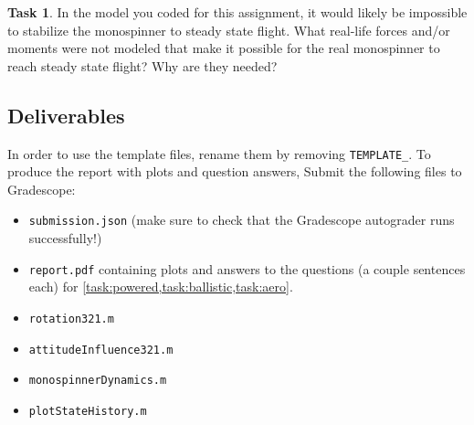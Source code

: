 \documentclass{article}
\theoremstyle{definition}
\newtheorem{task}{Task}
\begin{document}
\begin{task}\label{task:aero}
    In the model you coded for this assignment, it would likely be impossible to stabilize the monospinner to steady state flight. What real-life forces and/or moments were not modeled that make it possible for the real monospinner to reach steady state flight? Why are they needed?
\end{task}

\subsection*{Deliverables}
In order to use the template files, rename them by removing \texttt{TEMPLATE\_}. To produce the report with plots and question answers, Submit the following files to Gradescope:
\begin{itemize}[noitemsep]
    \item \texttt{submission.json} (make sure to check that the Gradescope autograder runs successfully!)
    \item \texttt{report.pdf} containing plots and answers to the questions (a couple sentences each) for \cref{task:powered,task:ballistic,task:aero}.
    \item \texttt{rotation321.m}
    \item \texttt{attitudeInfluence321.m}
    \item \texttt{monospinnerDynamics.m}
    \item \texttt{plotStateHistory.m}
\end{itemize}



\end{document}
